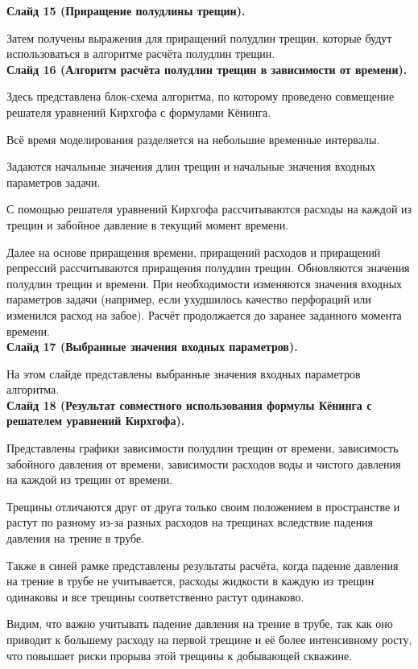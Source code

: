 \documentclass[a4paper, 12pt]{article}
\begin{document}
\textbf{Слайд 15 (Приращение полудлины трещин).}

Затем получены выражения для приращений полудлин трещин, которые будут использоваться в алгоритме расчёта полудлин трещин.
\\


\textbf{Слайд 16 (Алгоритм расчёта полудлин трещин в зависимости от времени).}

Здесь представлена блок-схема алгоритма, по которому проведено совмещение решателя уравнений Кирхгофа с формулами Кёнинга.

Всё время моделирования разделяется на небольшие временные интервалы.

Задаются начальные значения длин трещин и начальные значения входных параметров задачи.

С помощью решателя уравнений Кирхгофа рассчитываются расходы на каждой из трещин и забойное давление в текущий момент времени.

Далее на основе приращения времени, приращений расходов и приращений репрессий рассчитываются приращения полудлин трещин.
Обновляются значения полудлин трещин и времени.
При необходимости изменяются значения входных параметров задачи (например, если ухудшилось качество перфораций или изменился расход на забое).
Расчёт продолжается до заранее заданного момента времени.
\\

\textbf{Слайд 17 (Выбранные значения входных параметров).}

На этом слайде представлены выбранные значения входных параметров алгоритма.
\\


\textbf{Слайд 18 (Результат совместного использования формулы Кёнинга с решателем уравнений Кирхгофа).}

Представлены графики зависимости полудлин трещин от времени, зависимость забойного давления от времени, зависимости расходов воды и чистого давления на каждой из трещин от времени.

Трещины отличаются друг от друга только своим положением в пространстве и растут по разному из-за разных расходов на трещинах вследствие падения давления на трение в трубе.

Также в синей рамке представлены результаты расчёта, когда падение давления на трение в трубе не учитывается, расходы жидкости в каждую из трещин одинаковы и все трещины соответственно растут одинаково.

Видим, что важно учитывать падение давления на трение в трубе, так как оно приводит к большему расходу на первой трещине и её более интенсивному росту, что повышает риски прорыва этой трещины к добывающей скважине.
\\
\end{document}
